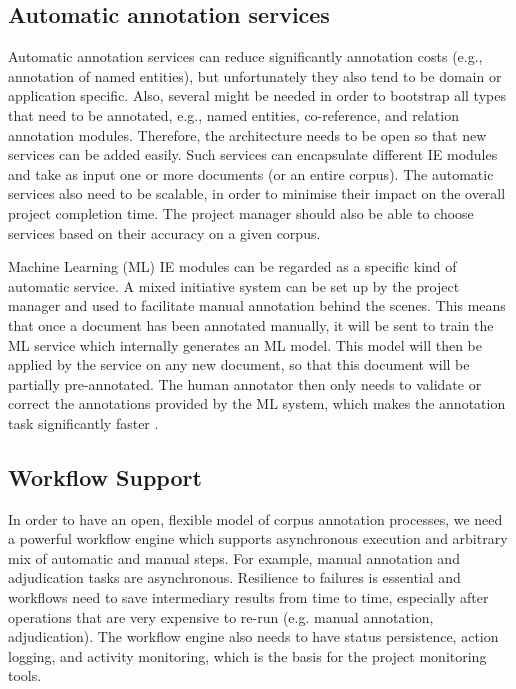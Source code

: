\subsection{Automatic annotation services}

Automatic annotation services can reduce significantly annotation costs (e.g., annotation of named entities), but unfortunately they also tend to be domain or application specific. Also, several might be needed in order to bootstrap all types that need to be annotated, e.g., named entities, co-reference, and relation annotation modules. Therefore, the architecture needs to be open so that new services can be added easily. Such services can encapsulate different IE modules  and take as input one or more documents (or an entire corpus). The automatic services also need to be scalable, in order to minimise their impact on the overall project completion time. The project manager should also be able to choose services based on their accuracy on a given corpus. 

Machine Learning (ML) IE modules can be regarded as a specific kind of automatic service.  A mixed initiative system \cite{Day97} can be set up by the project manager and used to facilitate manual annotation behind the scenes. This means that once a document has been annotated manually, it will be sent to train the ML service which internally generates an ML model. This model will then be applied by the service on any new document, so that this document will be partially pre-annotated. The human annotator then only needs to validate or correct the annotations provided by the ML system, which makes the annotation task significantly faster \cite{Day97}.

\subsection{Workflow Support}\label{sect:workflow-reqs}

In order to have an open, flexible model of corpus annotation processes, we need a powerful workflow engine which supports asynchronous execution and arbitrary mix of automatic and manual steps. For example, manual annotation and adjudication tasks are asynchronous.  Resilience to failures is essential and workflows need to save intermediary results from time to time, especially after operations that are very expensive to re-run (e.g. manual annotation, adjudication). The workflow engine also needs to have status persistence, action logging, and  activity monitoring, which is the basis for the project monitoring tools.

